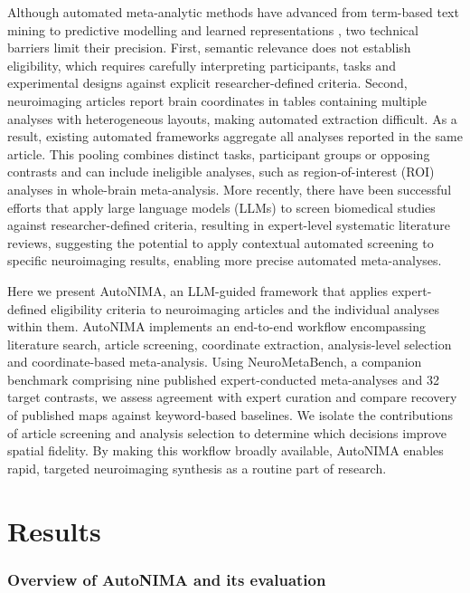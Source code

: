 Although automated meta-analytic methods have advanced from term-based text mining to predictive modelling and learned representations \cite{Dockes2020-ka,Hammonds2026-yb,Ghayem2026-vx,Peraza2025-mi,Ngo2022-if}, two technical barriers limit their precision. First, semantic relevance does not establish eligibility, which requires carefully interpreting participants, tasks and experimental designs against explicit researcher-defined criteria\cite{Muller2018-zo}. Second, neuroimaging articles report brain coordinates in tables containing multiple analyses with heterogeneous layouts, making automated extraction difficult. As a result, existing automated frameworks aggregate all analyses reported in the same article. This pooling combines distinct tasks, participant groups or opposing contrasts and can include ineligible analyses, such as region-of-interest (ROI) analyses in whole-brain meta-analysis. More recently, there have been successful efforts that apply large language models (LLMs) to screen biomedical studies against researcher-defined criteria\cite{Cao2025-pt,Issaiy2024-gp,Chen2026-fl}, resulting in expert-level systematic literature reviews, suggesting the potential to apply contextual automated screening to specific neuroimaging results, enabling more precise automated meta-analyses.

Here we present AutoNIMA, an LLM-guided framework that applies expert-defined eligibility criteria to neuroimaging articles and the individual analyses within them. AutoNIMA implements an end-to-end workflow encompassing literature search, article screening, coordinate extraction, analysis-level selection and coordinate-based meta-analysis. Using NeuroMetaBench, a companion benchmark comprising nine published expert-conducted meta-analyses and 32 target contrasts, we assess agreement with expert curation and compare recovery of published maps against keyword-based baselines. We isolate the contributions of article screening and analysis selection to determine which decisions improve spatial fidelity. By making this workflow broadly available, AutoNIMA enables rapid, targeted neuroimaging synthesis as a routine part of research.

\section{Results}

\subsubsection{Overview of AutoNIMA and its evaluation}

